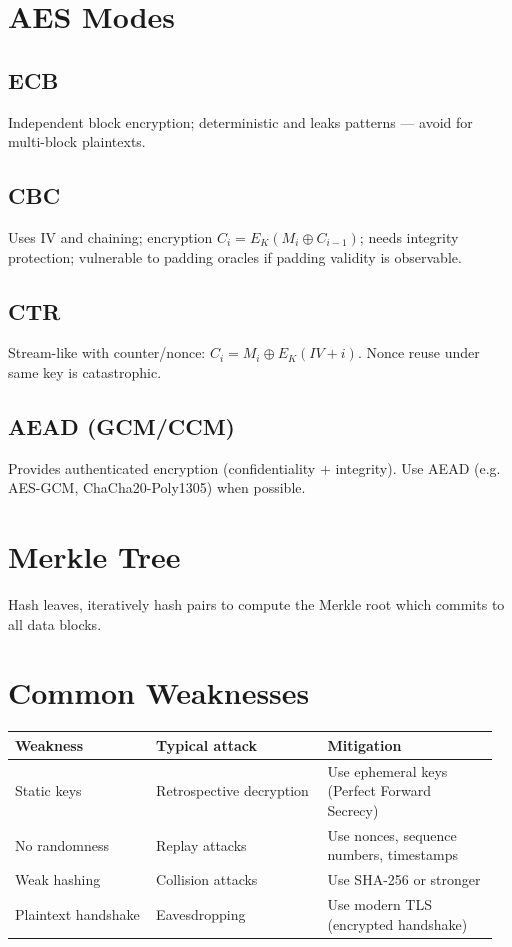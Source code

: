 \documentclass[11pt]{article}
\begin{document}
\section{AES Modes}
\subsection*{ECB}
Independent block encryption; deterministic and leaks patterns — avoid for multi-block plaintexts.

\subsection*{CBC}
Uses IV and chaining; encryption $C_i=E_K(M_i\oplus C_{i-1})$; needs integrity protection; vulnerable to padding oracles if padding validity is observable.

\subsection*{CTR}
Stream-like with counter/nonce: $C_i=M_i\oplus E_K(IV+i)$. Nonce reuse under same key is catastrophic.

\subsection*{AEAD (GCM/CCM)}
Provides authenticated encryption (confidentiality + integrity). Use AEAD (e.g. AES-GCM, ChaCha20-Poly1305) when possible.

\section{Merkle Tree}
Hash leaves, iteratively hash pairs to compute the Merkle root which commits to all data blocks.

\section{Common Weaknesses}
\begin{longtable}{p{0.28\linewidth} p{0.34\linewidth} p{0.34\linewidth}}
\toprule
\textbf{Weakness} & \textbf{Typical attack} & \textbf{Mitigation} \\
\midrule
Static keys & Retrospective decryption & Use ephemeral keys (Perfect Forward Secrecy) \\
No randomness & Replay attacks & Use nonces, sequence numbers, timestamps \\
Weak hashing & Collision attacks & Use SHA-256 or stronger \\
Plaintext handshake & Eavesdropping & Use modern TLS (encrypted handshake) \\
\bottomrule
\end{longtable}
\end{document}
